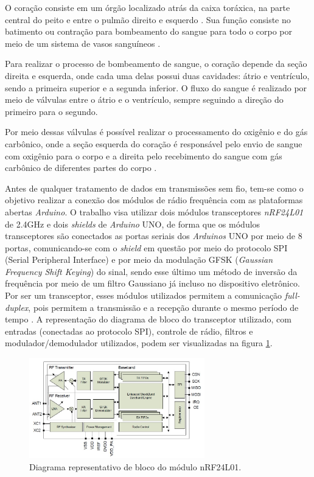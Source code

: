 \documentclass[conference]{IEEEtran}
\begin{document}
O coração consiste em um órgão localizado atrás da caixa toráxica, na parte central do peito e entre o pulmão direito e esquerdo \cite{nih2011}. Sua função consiste no batimento ou contração para bombeamento do sangue para todo o corpo por meio de um sistema de vasos sanguíneos \cite{gray1979}.

Para realizar o processo de bombeamento de sangue, o coração depende da seção direita e esquerda, onde cada uma delas possui duas cavidades: átrio e ventrículo, sendo a primeira superior e a segunda inferior. O fluxo do sangue é realizado por meio de válvulas entre o átrio e o ventrículo, sempre seguindo a direção do primeiro para o segundo.

Por meio dessas válvulas é possível realizar o processamento do oxigênio e do gás carbônico, onde a seção esquerda do coração é responsável pelo envio de sangue com oxigênio para o corpo e a direita pelo recebimento do sangue com gás carbônico de diferentes partes do corpo \cite{nih2011}.



Antes de qualquer tratamento de dados em transmiss\~oes sem fio, tem-se como o objetivo realizar a conex\~ao dos m\'odulos de r\'adio frequ\^encia com as plataformas abertas \textit{Arduino}. O trabalho visa utilizar dois m\'odulos transceptores \textit{nRF24L01} de 2.4GHz e dois \textit{shields} de \textit{Arduino} UNO, de forma que os m\'odulos transceptores s\~ao conectados as portas seriais dos \textit{Arduinos} UNO por meio de 8 portas, comunicando-se com o \textit{shield} em quest\~ao por meio do protocolo SPI (Serial Peripheral Interface) e por meio da modula\c{c}\~ao GFSK (\textit{Gaussian Frequency Shift Keying}) do sinal, sendo esse \'ultimo um m\'etodo de invers\~ao da frequ\^encia por meio de um filtro Gaussiano \cite{pdsGFSKModulation} j\'a incluso no dispositivo eletr\^onico. Por ser um transceptor, esses m\'odulos utilizados permitem a comunica\c{c}\~ao \textit{full-duplex}, pois permitem a transmiss\~ao e a recep\c{c}\~ao durante o mesmo per\'iodo de tempo \cite{datasheetNRF24L01}. A representa\c{c}\~ao do diagrama de bloco do transceptor utilizado, com entradas (conectadas ao protocolo SPI), controle de r\'adio, filtros e modulador/demodulador utilizados, podem ser visualizadas na figura \ref{diagramaNrf24l01}.

\begin{figure}[!b]
\centering
\includegraphics[width=3in]{diagramanrf24l01}
\caption{Diagrama representativo de bloco do m\'odulo nRF24L01.}
\label{diagramaNrf24l01}
\end{figure}
\end{document}
